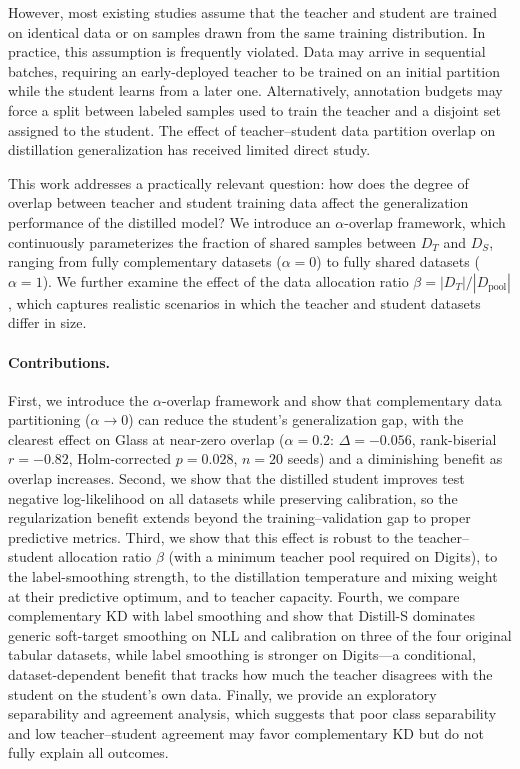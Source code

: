\documentclass[a4paper,fleqn]{cas-dc}
\begin{document}
However, most existing studies assume that the teacher and student are trained on identical data or on samples drawn from the same training distribution. In practice, this assumption is frequently violated. Data may arrive in sequential batches, requiring an early-deployed teacher to be trained on an initial partition while the student learns from a later one. Alternatively, annotation budgets may force a split between labeled samples used to train the teacher and a disjoint set assigned to the student. The effect of teacher--student data partition overlap on distillation generalization has received limited direct study.

This work addresses a practically relevant question: how does the degree of overlap between teacher and student training data affect the generalization performance of the distilled model? We introduce an $\alpha$-overlap framework, which continuously parameterizes the fraction of shared samples between $D_T$ and $D_S$, ranging from fully complementary datasets ($\alpha=0$) to fully shared datasets ($\alpha=1$). We further examine the effect of the data allocation ratio $\beta = |D_T|/|D_{\mathrm{pool}}|$, which captures realistic scenarios in which the teacher and student datasets differ in size.


\paragraph{Contributions.}

First, we introduce the $\alpha$-overlap framework and show that complementary data partitioning ($\alpha \to 0$) can reduce the student's generalization gap, with the clearest effect on Glass at near-zero overlap ($\alpha{=}0.2$: $\Delta=-0.056$, rank-biserial $r=-0.82$, Holm-corrected $p=0.028$, $n=20$ seeds) and a diminishing benefit as overlap increases. Second, we show that the distilled student improves test negative log-likelihood on all datasets while preserving calibration, so the regularization benefit extends beyond the training--validation gap to proper predictive metrics. Third, we show that this effect is robust to the teacher--student allocation ratio $\beta$ (with a minimum teacher pool required on Digits), to the label-smoothing strength, to the distillation temperature and mixing weight at their predictive optimum, and to teacher capacity. Fourth, we compare complementary KD with label smoothing and show that Distill-S dominates generic soft-target smoothing on NLL and calibration on three of the four original tabular datasets, while label smoothing is stronger on Digits---a conditional, dataset-dependent benefit that tracks how much the teacher disagrees with the student on the student's own data. Finally, we provide an exploratory separability and agreement analysis, which suggests that poor class separability and low teacher--student agreement may favor complementary KD but do not fully explain all outcomes.
\end{document}
